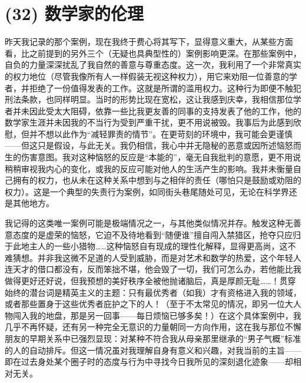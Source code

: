 \section{(32) 数学家的伦理}

昨天我记录的那个案例，现在我终于费心将其写下，显得意义重大，从某些方面看，比之前提到的另外三个（无疑也具典型性的）案例影响更深。在那些案例中，自负的力量深深扰乱了我自然的善意与尊重态度。这一次，我利用了一个非常真实的权力地位（尽管我像所有人一样假装无视这种权力），用它来劝阻一位善意的学者，并拒绝了一份值得发表的工作。这就是所谓的滥用权力。这种行为即便不触犯刑法条款，也同样明显。当时的形势比现在宽松，这让我感到庆幸，我相信那位学者并未因此受太大阻碍，依靠一些比我更友善的同事的支持发表了他的工作，他的数学家生涯并未因我的不当行为受到严重干扰，更不用说被毁。我事后为此感到欣慰，但并不想以此作为“减轻罪责的情节”。在更苛刻的环境中，我可能会更谨慎——但这只是假设，与此无关。我仍相信，我心中并无隐秘的恶意或因所述恼怒而生的伤害意图。我对这种恼怒的反应是“本能的”，毫无自我批判的意愿，更不用说稍稍审视我内心的变化，或我的反应可能对他人的生活产生的影响。我并未衡量自己拥有的权力，也从未在这种关系中想到与之相伴的责任（哪怕只是鼓励或劝阻的权力）。这是一个典型的失责行为案例，如同街头巷尾随处可见，无论在科学界还是其他地方。

我记得的这类唯一案例可能是极端情况之一，与其他类似情况并存。触发这种无善意态度的是虚荣的恼怒，它迫不及待地看到“随便谁”擅自闯入禁猎区，抢夺只应归于此地主人的一些小猎物……这种恼怒自有现成的理性化解释，显得更高尚，这不难猜想。并非我这微不足道的人受到威胁，而是对艺术和数学的热爱，这个年轻人连天才的借口都没有，反而笨拙不堪，他会毁了一切，我们可怎么办，若他能比我做得更好还好说，但我预想的美好秩序全被他抛诸脑后，真是厚颜无耻……！贯穿始终的潜台词是精英主义的主题：只有最优秀者（如我）才有资格进入我的领域，或者那些置身于这些优秀者庇护之下的人！（至于不太常见的情况，即另一位大人物闯入我的地盘，那是另一回事——每日烦恼已够多矣！）在这个具体案例中，我几乎不再怀疑，还有另一种完全无意识的力量朝同一方向作用，这在我与那位不懈朋友的早期关系中已强烈显现：对某种不符合我从母亲那里继承的“男子气概”标准的人的自动排斥。但这一情况虽对我理解自身有意义和兴趣，对我当前的主旨——即在过去身处某个圈子时的态度与行为中寻找今日我所见的深刻退化迹象——却相对无关。

